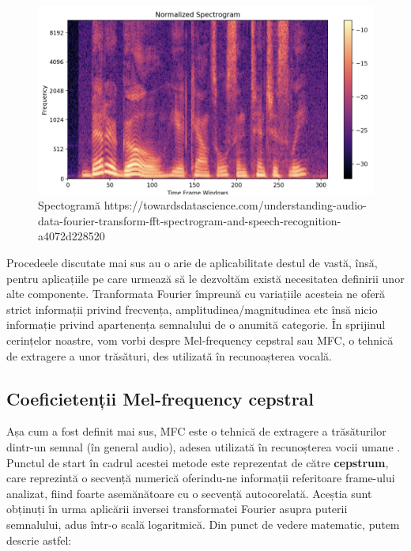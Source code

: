 \documentclass[a4paper,12pt]{report}
\begin{document}
	\begin{figure}[h]
		\begin{center}
			\includegraphics[scale=0.3]{images/spectogram.PNG}
		\end{center}
		\caption{Spectogramă \newline
			\hspace{\linewidth}https://towardsdatascience.com/understanding-audio-data-fourier-transform-fft-spectrogram-and-speech-recognition-a4072d228520}
		\label{fig:spectogram}
	\end{figure}
	
	Procedeele discutate mai sus au o arie de aplicabilitate destul de vastă, însă, pentru aplicațiile pe care urmează să le dezvoltăm există necesitatea definirii unor alte componente. Tranformata Fourier împreună cu variațiile acesteia ne oferă strict informații privind frecvența, amplitudinea/magnitudinea etc însă nicio informație privind apartenența semnalului de o anumită categorie. În sprijinul cerințelor noastre, vom vorbi despre Mel-frequency cepstral sau MFC, o tehnică de extragere a unor trăsături, des utilizată în recunoașterea vocală.	
    
    \clearpage
    \subsection{Coeficietenții Mel-frequency cepstral}
    Așa cum a fost definit mai sus, MFC este o tehnică de extragere a trăsăturilor dintr-un semnal (în general audio), adesea utilizată în recunoșterea vocii umane \cite{MFCC_PC}. Punctul de start în cadrul acestei metode este reprezentat de către \textbf{cepstrum}, care reprezintă o secvență numerică oferindu-ne informații referitoare frame-ului analizat, fiind foarte asemănătoare cu o secvență autocorelată. Aceștia sunt obținuți în urma aplicării inversei transformatei Fourier asupra puterii semnalului, adus într-o scală logaritmică. Din punct de vedere matematic, putem descrie astfel:
    
\end{document}
